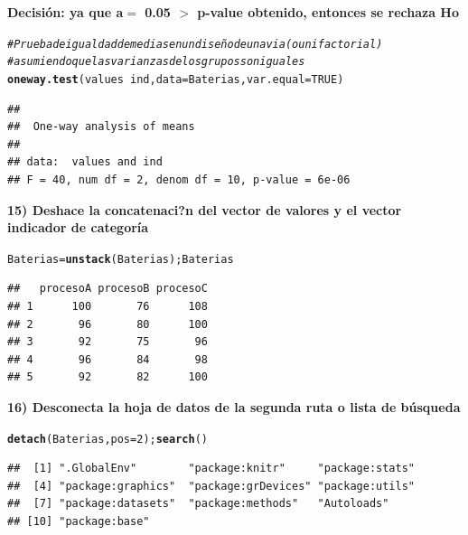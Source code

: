 \documentclass[12pt,letterpaper]{article}\usepackage[]{graphicx}\usepackage[]{color}
\makeatletter
\newcommand{\hlnum}[1]{\textcolor[rgb]{0.686,0.059,0.569}{#1}}%
\newcommand{\hlcom}[1]{\textcolor[rgb]{0.678,0.584,0.686}{\textit{#1}}}%
\newcommand{\hlopt}[1]{\textcolor[rgb]{0,0,0}{#1}}%
\newcommand{\hlstd}[1]{\textcolor[rgb]{0.345,0.345,0.345}{#1}}%
\newcommand{\hlkwb}[1]{\textcolor[rgb]{0.69,0.353,0.396}{#1}}%
\newcommand{\hlkwc}[1]{\textcolor[rgb]{0.333,0.667,0.333}{#1}}%
\newcommand{\hlkwd}[1]{\textcolor[rgb]{0.737,0.353,0.396}{\textbf{#1}}}%
\newenvironment{kframe}{%
 \def\at@end@of@kframe{}%
 \ifinner\ifhmode%
  \def\at@end@of@kframe{\end{minipage}}%
  \begin{minipage}{\columnwidth}%
 \fi\fi%
 \def\FrameCommand##1{\hskip\@totalleftmargin \hskip-\fboxsep
 \colorbox{shadecolor}{##1}\hskip-\fboxsep
     \hskip-\linewidth \hskip-\@totalleftmargin \hskip\columnwidth}%
 \MakeFramed {\advance\hsize-\width
   \@totalleftmargin\z@ \linewidth\hsize
   \@setminipage}}%
 {\par\unskip\endMakeFramed%
 \at@end@of@kframe}
\newenvironment{knitrout}{}{} %
\makeatother
\begin{document}
\textbf{Decisi\'on: ya que  a$=$ 0.05 $>$ p-value obtenido, entonces se rechaza Ho}
\begin{knitrout}
\color{fgcolor}\begin{kframe}
\begin{alltt}
\hlcom{# Prueba de igualdad de medias en un diseño de una via (o unifactorial) }
\hlcom{# asumiendo  que las varianzas de los grupos son iguales }
\hlkwd{oneway.test}\hlstd{(values}\hlopt{~}\hlstd{ind,} \hlkwc{data}\hlstd{=Baterias,} \hlkwc{var.equal} \hlstd{=} \hlnum{TRUE}\hlstd{)}
\end{alltt}
\begin{verbatim}
## 
## 	One-way analysis of means
## 
## data:  values and ind
## F = 40, num df = 2, denom df = 10, p-value = 6e-06
\end{verbatim}
\end{kframe}
\end{knitrout}
\textbf {15) Deshace la concatenaci?n del vector de valores y el vector indicador de categor\'ia} 
\begin{knitrout}
\color{fgcolor}\begin{kframe}
\begin{alltt}
\hlstd{Baterias} \hlkwb{=} \hlkwd{unstack}\hlstd{(Baterias);Baterias}
\end{alltt}
\begin{verbatim}
##   procesoA procesoB procesoC
## 1      100       76      108
## 2       96       80      100
## 3       92       75       96
## 4       96       84       98
## 5       92       82      100
\end{verbatim}
\end{kframe}
\end{knitrout}
\textbf{16) Desconecta la hoja de datos de la segunda ruta o lista de b\'usqueda}
\begin{knitrout}
\color{fgcolor}\begin{kframe}
\begin{alltt}
\hlkwd{detach}\hlstd{(Baterias,} \hlkwc{pos}\hlstd{=}\hlnum{2}\hlstd{);} \hlkwd{search}\hlstd{()}
\end{alltt}
\begin{verbatim}
##  [1] ".GlobalEnv"        "package:knitr"     "package:stats"    
##  [4] "package:graphics"  "package:grDevices" "package:utils"    
##  [7] "package:datasets"  "package:methods"   "Autoloads"        
## [10] "package:base"
\end{verbatim}
\end{kframe}
\end{knitrout}
\end{document}
